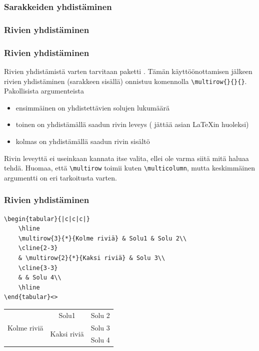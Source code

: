 \begin{frame}[fragile]
    \frametitle{Sarakkeiden yhdistäminen}

    
\end{frame}

\subsubsection{Rivien yhdistäminen}
\begin{frame}[fragile]
    \frametitle{Rivien yhdistäminen}
    Rivien yhdistämistä varten tarvitaan paketti . Tämän käyttöönottamisen jälkeen rivien yhdistäminen (sarakkeen sisällä) onnistuu komennolla \lstinline-\multirow{}{}{}-. Pakollisista argumenteista
    \begin{itemize}
        \item ensimmäinen on yhdistettävien solujen lukumäärä
        \item toinen on yhdistämällä saadun rivin leveys (\cns{*} jättää asian \LaTeX in huoleksi)
        \item kolmas on yhdistämällä saadun rivin sisältö
    \end{itemize}
    Rivin leveyttä ei useinkaan kannata itse valita, ellei ole varma siitä mitä haluaa tehdä. 
    \vaihto
    Huomaa, että \lstinline-\multirow- toimii kuten \lstinline-\multicolumn-, mutta keskimmäinen argumentti on eri tarkoitusta varten.
\end{frame}

\begin{frame}[fragile]
    \frametitle{Rivien yhdistäminen} 
    \begin{lstlisting}
\begin{tabular}{|c|c|c|}
    \hline
    \multirow{3}{*}{Kolme riviä} & Solu1 & Solu 2\\
    \cline{2-3}
    & \multirow{2}{*}{Kaksi riviä} & Solu 3\\
    \cline{3-3}
    & & Solu 4\\
    \hline
\end{tabular}<>
    \end{lstlisting}
    \begin{serif}
        \begin{small}
            \begin{tabular}{|c|c|c|}
                \hline
                \multirow{3}{*}{Kolme riviä} & Solu1	& Solu 2\\\cline{2-3}
                                              & \multirow{2}{*}{Kaksi riviä}	& Solu 3\\\cline{3-3}
                                              & & Solu 4\\
                \hline
            \end{tabular}
        \end{small}
    \end{serif}
\end{frame}

